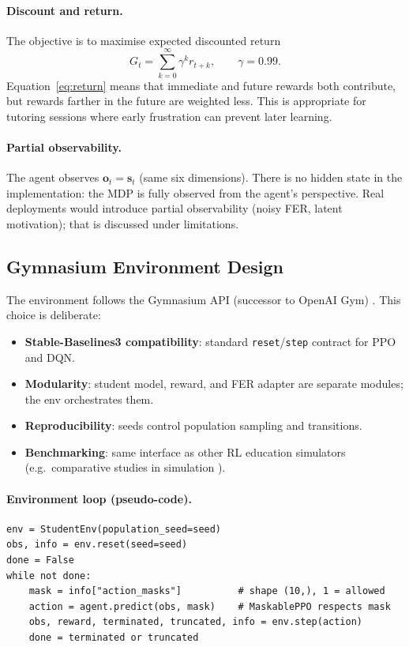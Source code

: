 \paragraph{Discount and return.}
The objective is to maximise expected discounted return
\begin{equation}
    G_t = \sum_{k=0}^{\infty} \gamma^k r_{t+k}, \qquad \gamma = 0.99.
    \label{eq:return}
\end{equation}
Equation~\eqref{eq:return} means that immediate and future rewards both contribute, but rewards farther in the future are weighted less. This is appropriate for tutoring sessions where early frustration can prevent later learning.

\paragraph{Partial observability.}
The agent observes $\mathbf{o}_t = \mathbf{s}_t$ (same six dimensions). There is no hidden state in the implementation: the MDP is fully observed from the agent's perspective. Real deployments would introduce partial observability (noisy FER, latent motivation); that is discussed under limitations.

\subsection{Gymnasium Environment Design}\label{sec:method_gymnasium}

The environment follows the Gymnasium API (successor to OpenAI Gym) \cite{towers_gymnasium_2023,axak_adaptive_nodate}. This choice is deliberate:
\begin{itemize}
    \item \textbf{Stable-Baselines3 compatibility}: standard \texttt{reset}/\texttt{step} contract for PPO and DQN.
    \item \textbf{Modularity}: student model, reward, and FER adapter are separate modules; the env orchestrates them.
    \item \textbf{Reproducibility}: seeds control population sampling and transitions.
    \item \textbf{Benchmarking}: same interface as other RL education simulators (e.g.\ comparative studies in simulation \cite{azoulay_adaptive_2021,weitekamp_tutorgym_2025}).
\end{itemize}

\paragraph{Environment loop (pseudo-code).}
\begin{verbatim}
env = StudentEnv(population_seed=seed)
obs, info = env.reset(seed=seed)
done = False
while not done:
    mask = info["action_masks"]          # shape (10,), 1 = allowed
    action = agent.predict(obs, mask)    # MaskablePPO respects mask
    obs, reward, terminated, truncated, info = env.step(action)
    done = terminated or truncated
\end{verbatim}

